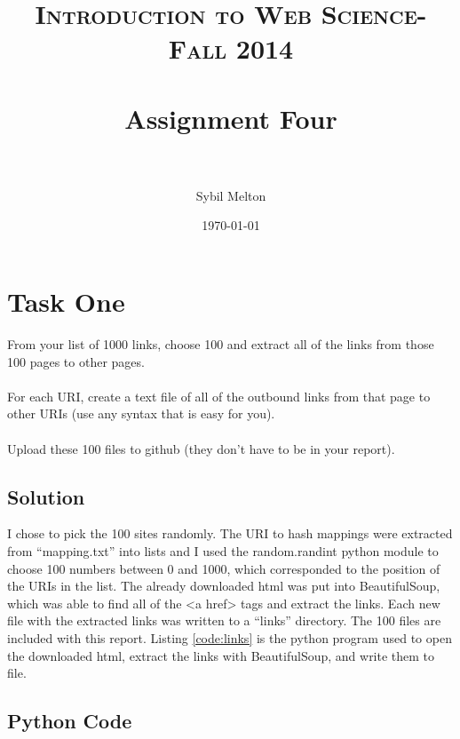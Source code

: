\documentclass[paper=a4, fontsize=11pt]{scrartcl} %
\title{	
\normalfont \normalsize 
\textsc{Introduction to Web Science- Fall 2014} \\ [25pt] %
\horrule{0.5pt} \\[0.4cm] %
\huge Assignment Four \\ %
\horrule{2pt} \\[0.5cm] %
}
\author{Sybil Melton} %
\date{\normalsize\today} %
\numberwithin{equation}{section} %
\numberwithin{figure}{section} %
\numberwithin{table}{section} %
\begin{document}
\maketitle %
\newpage
\tableofcontents
\listoffigures
\lstlistoflistings
\newpage

\section{Task One}

From your list of 1000 links, choose 100 and extract all of the
links from those 100 pages to other pages.
\\
\\
For each URI, create a text file of all of the outbound links from
that page to other URIs (use any syntax that is easy for you).
\\
\\
Upload these 100 files to github (they don't have to be in your report).

\subsection{Solution}
I chose to pick the 100 sites randomly. 
The URI to hash mappings were extracted from ``mapping.txt'' into lists
 and I used the random.randint python module to choose 100 numbers between 0 and 1000, which corresponded to the position of the URIs in the list. \cite{bib:rand}
 The already downloaded html was put into BeautifulSoup, which was able to find all of the <a href> tags and extract the links.\cite{bib:bs4}
 Each new file with the extracted links was written to a ``links'' directory.\cite{bib:files}
The 100 files are included with this report.
Listing \ref{code:links} is the python program used to open the downloaded html, extract the links with BeautifulSoup, and write them to file.  


\subsection{Python Code}



\newpage 
\end{document}
